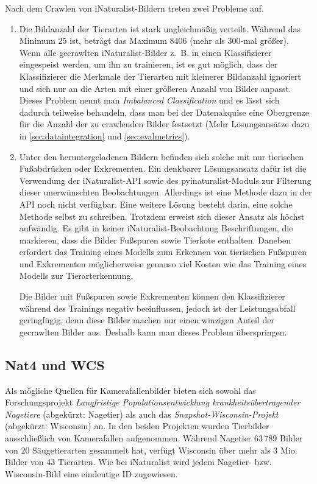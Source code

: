 Nach dem Crawlen von iNaturalist-Bildern treten zwei Probleme auf.

\begin{enumerate}
	\item Die Bildanzahl der Tierarten ist stark ungleichmäßig verteilt. Während das Minimum 25 ist, beträgt das Maximum 8406 (mehr als 300-mal größer). Wenn alle gecrawlten iNaturalist-Bilder z.~B. in einen Klassifizierer eingespeist werden, um ihn zu trainieren, ist es gut möglich, dass der Klassifizierer die Merkmale der Tierarten mit kleinerer Bildanzahl ignoriert und sich nur an die Arten mit einer größeren Anzahl von Bilder anpasst. Dieses Problem nennt man \emph{Imbalanced Classification} und es lässt sich dadurch teilweise behandeln, dass man bei der Datenakquise eine Obergrenze für die Anzahl der zu crawlenden Bilder festsetzt (Mehr Lösungsansätze dazu in \autoref{sec:dataintegration} und \autoref{sec:evalmetrics}).

	\item Unter den heruntergeladenen Bildern befinden sich solche mit nur tierischen Fußabdrücken oder Exkrementen. Ein denkbarer Lösungsansatz dafür ist die Verwendung der iNaturalist-API sowie des pyinaturalist-Moduls zur Filterung dieser unerwünschten Beobachtungen. Allerdings ist eine Methode dazu in der API noch nicht verfügbar. Eine weitere Lösung besteht darin, eine solche Methode selbst zu schreiben. Trotzdem erweist sich dieser Ansatz als höchst aufwändig. Es gibt in keiner iNaturalist-Beobachtung Beschriftungen, die markieren, dass die Bilder Fußspuren sowie Tierkote enthalten. Daneben erfordert das Training eines Modells zum Erkennen von tierischen Fußspuren und Exkrementen möglicherweise genauso viel Kosten wie das Training eines Modells zur Tierarterkennung.
	
	Die Bilder mit Fußspuren sowie Exkrementen können den Klassifizierer während des Trainings negativ beeinflussen, jedoch ist der Leistungsabfall geringfügig, denn diese Bilder machen nur einen winzigen Anteil der gecrawlten Bilder aus. Deshalb kann man dieses Problem überspringen.
\end{enumerate}

\subsection{Nat4 und WCS}

Als mögliche Quellen für Kamerafallenbilder bieten sich sowohl das Forschungsprojekt \emph{Langfristige Populationsentwicklung krankheitsübertragender Nagetiere} (abgekürzt: Nagetier) \cite{imholt2021langfristige} als auch das \emph{Snapshot-Wisconsin-Projekt} (abgekürzt: Wisconsin) an. In den beiden Projekten wurden Tierbilder ausschließlich von Kamerafallen aufgenommen. Während Nagetier 63\,789 Bilder von 20 Säugetierarten gesammelt hat, verfügt Wisconsin über mehr als 3 Mio. Bilder von 43 Tierarten. Wie bei iNaturalist wird jedem Nagetier- bzw. Wisconsin-Bild eine eindeutige ID zugewiesen.


